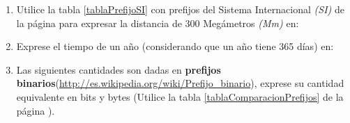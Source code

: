 \documentclass[12pt]{article}
\begin{document}
\begin{enumerate}

    \item Utilice la tabla \ref{tablaPrefijoSI} con prefijos del Sistema
        Internacional \emph{(SI)} de la página \pageref{tablaPrefijoSI} para
        expresar la distancia de 300 Megámetros \emph{(Mm)} en:


    \item Exprese el tiempo de un año (considerando que un año tiene 365 días)
        en:


    \item Las siguientes cantidades son dadas en \textbf{prefijos
        binarios}(\url{http://es.wikipedia.org/wiki/Prefijo_binario}), exprese
        su cantidad equivalente en bits y bytes (Utilice la tabla
        \ref{tablaComparacionPrefijos} de la página
        \pageref{tablaComparacionPrefijos}).


\end{enumerate}
\end{document}
